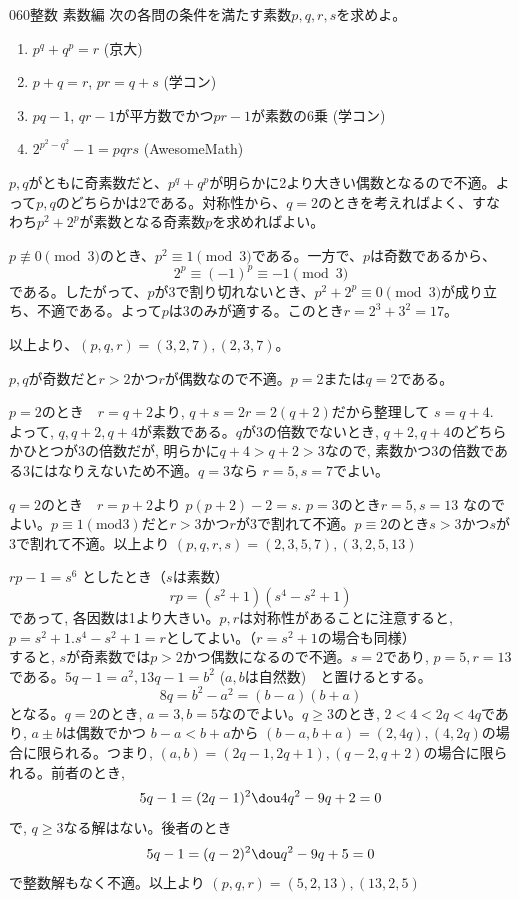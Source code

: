 \begin{prob}{060}{}{整数 素数編}
 次の各問の条件を満たす素数$p, q, r, s$を求めよ。
 \begin{enumerate}
  \item $p^q+q^p=r$ (京大)
  \item $p+q=r$, $pr=q+s$ (学コン)
  \item $pq-1$, $qr-1$が平方数でかつ$pr-1$が素数の6乗 (学コン)
  \item $2^{p^2-q^2}-1=pqrs$ (AwesomeMath)
 \end{enumerate}
\end{prob}

$p, q$がともに奇素数だと、$p^q+q^p$が明らかに2より大きい偶数となるので不適。よって$p, q$のどちらかは2である。対称性から、$q=2$のときを考えればよく、すなわち$p^2+2^p$が素数となる奇素数$p$を求めればよい。

$p\not\equiv 0 \pmod{3}$のとき、$p^2\equiv 1 \pmod{3}$である。一方で、$p$は奇数であるから、
\[ 2^p \equiv (-1)^p \equiv -1 \pmod{3} \]
である。したがって、$p$が3で割り切れないとき、$p^2+2^p\equiv 0 \pmod{3}$が成り立ち、不適である。よって$p$は3のみが適する。このとき$r=2^3+3^2=17$。

以上より、$(p, q, r)=(3, 2, 7), (2, 3, 7)$。

$p,q$が奇数だと$r>2$かつ$r$が偶数なので不適。$p=2$または$q=2$である。

$p=2$のとき　$r=q+2$より, $q+s=2r=2(q+2)$だから整理して $s=q+4$.　よって, $q,q+2,q+4$が素数である。$q$が3の倍数でないとき, $q+2, q+4$のどちらかひとつが3の倍数だが, 明らかに$q+4>q+2>3$なので, 素数かつ3の倍数である3にはなりえないため不適。$q=3$なら $r=5, s=7$でよい。

$q=2$のとき　$r=p+2$より $p(p+2)-2=s$. $p=3$のとき$r=5, s=13$ なのでよい。$p\equiv 1 　(\mbox{mod} 3)$だと$r>3$かつ$r$が3で割れて不適。$p\equiv 2$のとき$s>3$かつ$s$が3で割れて不適。以上より $(p,q,r,s)=(2,3,5,7), (3,2,5,13)$

$rp-1=s^6$ としたとき（$s$は素数）
\[rp=(s^2+1)(s^4-s^2+1)\]
であって, 各因数は1より大きい。$p,r$は対称性があることに注意すると, $p=s^2+1. s^4-s^2+1=r$としてよい。（$r=s^2+1$の場合も同様）\\
すると, $s$が奇素数では$p>2$かつ偶数になるので不適。$s=2$であり, $p=5, r=13$である。$5q-1=a^2, 13q-1=b^2$ ($a,b$は自然数)　と置けるとする。
\[8q=b^2-a^2=(b-a)(b+a)\]
となる。$q=2$のとき, $a=3, b=5$なのでよい。$q\geq 3$のとき, $2<4<2q<4q$であり, $a\pm b$は偶数でかつ $b-a<b+a$から $(b-a,b+a)=(2, 4q), (4,2q)$の場合に限られる。つまり, $(a,b)=(2q-1, 2q+1), (q-2, q+2)$の場合に限られる。前者のとき,
\[5q-1=(2q-1)^2 \dou 4q^2-9q+2=0\]
で, $q\geq 3$なる解はない。後者のとき
\[5q-1=(q-2)^2 \dou q^2-9q+5=0\]
で整数解もなく不適。以上より $(p,q,r)=(5,2,13), (13,2,5)$


